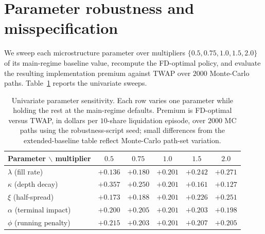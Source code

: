 \documentclass[]{interact}
\theoremstyle{plain}
\theoremstyle{definition}
\theoremstyle{remark}
\newcommand{\1}[1]{\mathbf{1}_{\{#1\}}}
\begin{document}
\section{Parameter robustness and misspecification}\label{sec:robustness}

We sweep each microstructure parameter over multipliers $\{0.5, 0.75, 1.0, 1.5, 2.0\}$ of its main-regime baseline value, recompute the FD-optimal policy, and evaluate the resulting implementation premium against TWAP over $2000$ Monte-Carlo paths. Table~\ref{tab:tab6} reports the univariate sweeps.

\begin{table}[t]
\centering
\caption{Univariate parameter sensitivity. Each row varies one parameter while holding the rest at the main-regime defaults. Premium is FD-optimal versus TWAP, in dollars per $10$-share liquidation episode, over $2000$ MC paths using the robustness-script seed; small differences from the extended-baseline table reflect Monte-Carlo path-set variation.}
\label{tab:tab6}
\begin{tabular}{@{}lccccc@{}}
\toprule
Parameter $\backslash$ multiplier & $0.5$ & $0.75$ & $1.0$ & $1.5$ & $2.0$ \\
\midrule
$\lambda$ (fill rate)        & $+0.136$ & $+0.180$ & $+0.201$ & $+0.242$ & $+0.271$ \\
$\kappa$ (depth decay)       & $+0.357$ & $+0.250$ & $+0.201$ & $+0.161$ & $+0.127$ \\
$\xi$ (half-spread)          & $+0.173$ & $+0.188$ & $+0.201$ & $+0.226$ & $+0.251$ \\
$\alpha$ (terminal impact)   & $+0.200$ & $+0.205$ & $+0.201$ & $+0.203$ & $+0.198$ \\
$\phi$ (running penalty)     & $+0.215$ & $+0.203$ & $+0.201$ & $+0.207$ & $+0.205$ \\
\bottomrule
\end{tabular}
\end{table}
\end{document}
